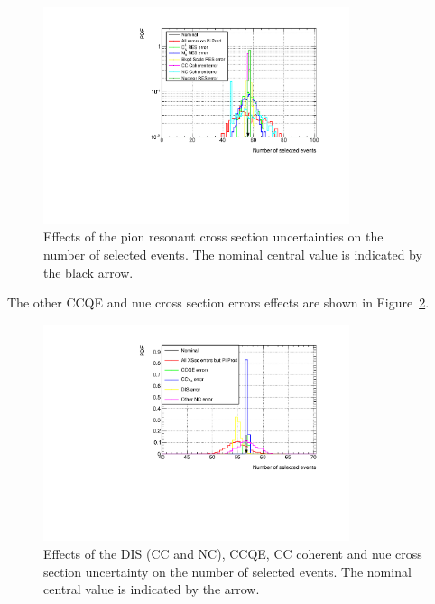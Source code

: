\begin{figure}[ht]
  \begin{adjustbox}{center}
    \includegraphics[width=0.8\textwidth]{images/NCg/PiProd.pdf} 
  \end{adjustbox}
  \center
  \caption[Effects of the pion resonant cross section uncertainties on
  the number of selected events]{Effects of the pion resonant cross
    section uncertainties on the number of selected events. The
    nominal central value is indicated by the black arrow.}
  \label{fig:infvpiproduncertainty}
\end{figure}

The other \Gls{CCQE} and \gls{nue} cross section errors effects are
shown in Figure~\ref{fig:infvotheruncertainty}.

\begin{figure}[ht]
  \center
  \includegraphics[width=0.8\textwidth]{images/NCg/Other_Jon.pdf} 
  \caption[Effects of the DIS (CC and NC), CCQE, CC coherent and nue
  cross section uncertainty on the number of selected events]{Effects
    of the \Gls{DIS} (\Gls{CC} and \Gls{NC}), \Gls{CCQE}, \Gls{CC}
    coherent and \gls{nue} cross section uncertainty on the number of
    selected events. The nominal central value is indicated by the
    arrow.}
  \label{fig:infvotheruncertainty}
\end{figure}


